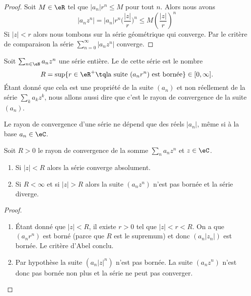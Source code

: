 \begin{proof}
    Soit \( M\in \eR\) tel que \( | a_n |r^n\leq M\) pour tout \( n\). Alors nous avons
    \begin{equation}
        | a_nz^n |=| a_n |r^n\big( \frac{ | z | }{ r } \big)^n\leq M\left( \frac{ | z | }{ r } \right)^n
    \end{equation}
    Si \( | z |<r\) alors nous tombons sur la série géométrique qui converge. Par le critère de comparaison la série \( \sum_{n=0}^{\infty}| a_nz^n |\) converge.
\end{proof}

\begin{definition}  \label{DefZWKOZOl}
    Soit \( \sum_{n\in \eN}a_nz^n\) une série entière. Le  de cette série est le nombre
    \begin{equation}
        R=\sup\{ r\in \eR^+\tq \text{la suite \((a_nr^n)\) est bornée} \}\in\mathopen[ 0 , \infty \mathclose].
    \end{equation}
    Étant donné que cela est une propriété de la suite \( (a_n)\) et non réellement de la série \( \sum_ka_kz^k\), nous allons aussi dire que c'est le rayon de convergence de la suite \( (a_n)\).
\end{definition}
Le rayon de convergence d'une série ne dépend que des réels \( | a_n |\), même si à la base \( a_n\in \eC\).

\begin{theorem} \label{ThoLPWeIHE}
    Soit \( R>0\) le rayon de convergence de la somme \( \sum_na_nz^n\) et \( z\in \eC\).
    \begin{enumerate}
        \item
            Si \( | z |<R\) alors la série converge absolument.
        \item
            Si \( R<\infty\) et si \( | z |>R\) alors la suite \( (a_nz^n)\) n'est pas bornée et la série diverge.
    \end{enumerate}
\end{theorem}

\begin{proof}
    \begin{enumerate}
        \item
            Étant donné que \( | z |<R\), il existe \( r>0\) tel que \( | z |<r<R\). On a que \( (a_nr^n)\) est borné (parce que \( R\) est le supremum) et donc \( (a_n| z_n |)\) est bornée. Le critère d'Abel conclu.
        \item
            Par hypothèse la suite \( (a_n| z |^n)\) n'est pas bornée. La suite \( (a_nz^n)\) n'est donc pas bornée non plus et la série ne peut pas converger.
    \end{enumerate}
\end{proof}

